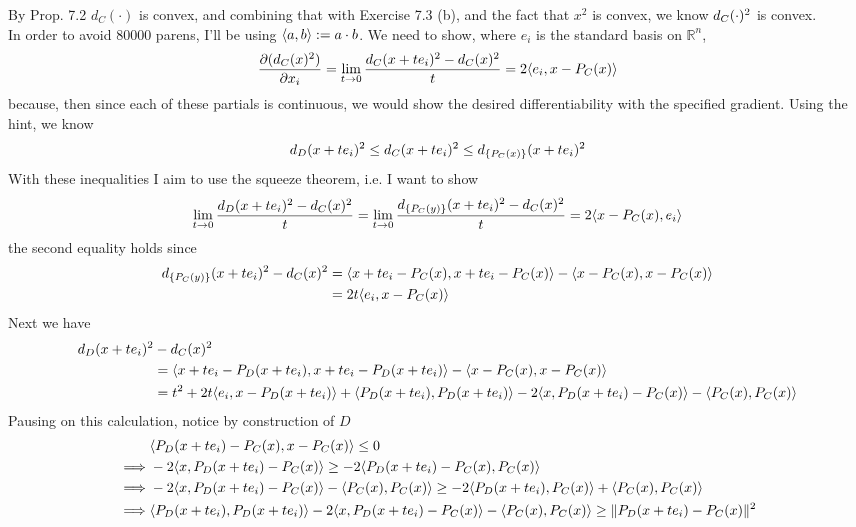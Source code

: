 \documentclass{article}
\newenvironment{ex}[1]
  {\renewcommand\theexercise{#1}\exercise}
  {\endexercise}
\newcommand{\R}[1]{\mathbb{R}^{#1}}
\begin{document}
\begin{ex}{7.7} %
  \newcommand{\dd}[2]{d_{#1}\parens{#2}^2}
  \newcommand{\pp}[2]{P_{#1}\parens{#2}}
  By Prop. 7.2 $d_C(\cdot)$ is convex, and combining that with Exercise 7.3 (b), and the fact that $x^2$ is convex, we know $\dd{C}{\cdot}$ is convex. \, \\

  In order to avoid 80000 parens, I'll be using $\langle a, b\rangle := a \cdot b$. We need to show, where $e_i$ is the standard basis on $\R{n}$,
  $$
  \frac{\partial \parens{\dd{C}{x}}}{\partial x_i} = \lim_{t \to 0} \frac{\dd{C}{x + t e_i} - \dd{C}{x}}{t} = 2\iprod{e_i}{x-\pp{C}{x}}
  $$
  because, then since each of these partials is continuous, we would show the desired differentiability with the specified gradient. Using the hint, we know
  $$
  \dd{D}{x + t e_i} \le \dd{C}{x + t e_i} \le \dd{\{\pp{C}{x}\}}{x + t e_i}
  $$
  With these inequalities I aim to use the squeeze theorem, i.e. I want to show
  $$
  \lim_{t \to 0} \frac{\dd{D}{x + t e_i} - \dd{C}{x}}{t} = \lim_{t \to 0} \frac{\dd{\{\pp{C}{y}\}}{x + t e_i} - \dd{C}{x}}{t} = 2\iprod{x-\pp{C}{x}}{e_i}
  $$
  the second equality holds since
  \begin{align*}
    \dd{\{\pp{C}{y}\}}{x + t e_i} - \dd{C}{x} &= \iprod{x + te_i - \pp{C}{x}}{x+te_i-\pp{C}{x}} - \iprod{x - \pp{C}{x}}{x - \pp{C}{x}} \\
    &= 2t \iprod{e_i}{x-\pp{C}{x}}
  \end{align*}
  Next we have
  \begin{align*}
    \dd{D}{x + t e_i} &- \dd{C}{x} \\
    &= \iprod{x+te_i - \pp{D}{x+te_i}}{x+te_i - \pp{D}{x+te_i}} - \iprod{x - \pp{C}{x}}{x - \pp{C}{x}} \\
    &= t^2 + 2t \iprod{e_i}{x-\pp{D}{x+te_i}} + \iprod{\pp{D}{x+te_i}}{\pp{D}{x+te_i}} - 2\iprod{x}{\pp{D}{x+te_i} - \pp{C}{x}} - \iprod{\pp{C}{x}}{\pp{C}{x}}
  \end{align*}
  Pausing on this calculation, notice by construction of $D$
  \begin{align*}
    &\iprod{\pp{D}{x+te_i} - \pp{C}{x}}{x-\pp{C}{x}} \le 0 \\
    \implies & -2\iprod{x}{\pp{D}{x+te_i} - \pp{C}{x}} \ge -2 \iprod{\pp{D}{x+te_i} - \pp{C}{x}}{\pp{C}{x}} \\
    \implies & - 2\iprod{x}{\pp{D}{x+te_i} - \pp{C}{x}} - \iprod{\pp{C}{x}}{\pp{C}{x}} \ge -2\iprod{\pp{D}{x+te_i}}{\pp{C}{x}} + \iprod{\pp{C}{x}}{\pp{C}{x}} \\
    \implies & \iprod{\pp{D}{x+te_i}}{\pp{D}{x+te_i}} - 2\iprod{x}{\pp{D}{x+te_i} - \pp{C}{x}} - \iprod{\pp{C}{x}}{\pp{C}{x}} \ge \norm{\pp{D}{x+te_i}-\pp{C}{x}}^2

\end{align*}
\end{ex}
\end{document}
